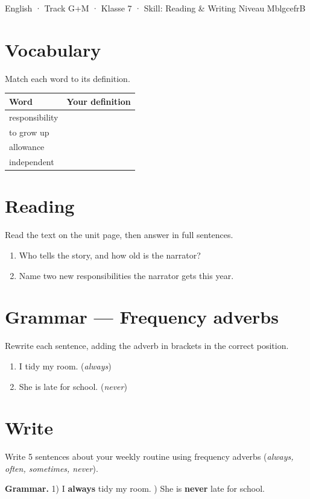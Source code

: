 \documentclass[11pt]{article}
\begin{document}
%
  {English · Track G+M · Klasse 7 · Skill: Reading \& Writing}%
  {Niveau M}{blgcefrB}

\begin{sheetbody}
\section{Vocabulary}
Match each word to its definition.

\begin{tabularx}{\linewidth}{@{}p{4cm}X@{}}
\toprule
\textbf{Word} & \textbf{Your definition} \\
\midrule
responsibility & \\[0.6em]
to grow up     & \\[0.6em]
allowance      & \\[0.6em]
independent    & \\
\bottomrule
\end{tabularx}

\section{Reading}
Read the text on the unit page, then answer in full sentences.

\begin{enumerate}
  \item Who tells the story, and how old is the narrator?
  \item Name two new responsibilities the narrator gets this year.
\end{enumerate}
\blglines[2]

\section{Grammar — Frequency adverbs}
Rewrite each sentence, adding the adverb in brackets in the correct position.
\begin{enumerate}
  \item I tidy my room. (\textit{always})
  \item She is late for school. (\textit{never})
\end{enumerate}
\blglines[2]

\section{Write}
Write 5 sentences about your weekly routine using frequency adverbs
(\textit{always, often, sometimes, never}).
\blglines[5]

\begin{blganswers}
\textbf{Grammar.} 1) I \textbf{always} tidy my room. ) She is \textbf{never} late for school.
\end{blganswers}
\end{sheetbody}
\end{document}
